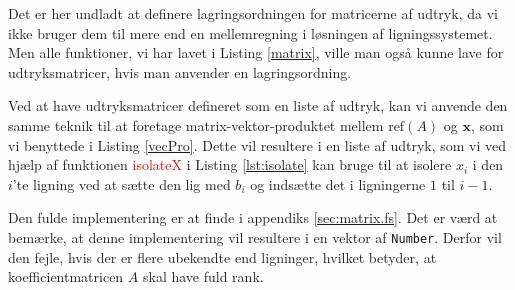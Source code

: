 Det er her undladt at definere lagringsordningen for matricerne af udtryk, da vi ikke bruger dem til mere end en mellemregning i løsningen af ligningssystemet. Men alle funktioner, vi har lavet i Listing \ref{matrix}, ville man også kunne lave for udtryksmatricer, hvis man anvender en lagringsordning.

Ved at have udtryksmatricer defineret som en liste af udtryk, kan vi anvende den samme teknik til at foretage matrix-vektor-produktet mellem \(\text{ref}(A)\) og \(\mathbf{x}\), som vi benyttede i Listing \ref{vecPro}. Dette vil resultere i en liste af udtryk, som vi ved hjælp af funktionen \textcolor{red}{isolateX} i Listing \ref{lst:isolate} kan bruge til at isolere \(x_i\) i den \(i\)'te ligning ved at sætte den lig med $b_i$ og indsætte det i ligningerne \(1\) til \(i - 1\).

Den fulde implementering er at finde i appendiks \ref{sec:matrix.fs}. Det er værd at bemærke, at denne implementering vil resultere i en vektor af \texttt{Number}. Derfor vil den fejle, hvis der er flere ubekendte end ligninger, hvilket betyder, at koefficientmatricen $A$ skal have fuld rank.



